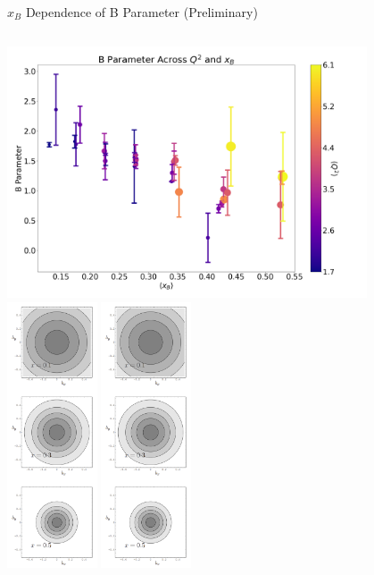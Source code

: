\documentclass[aspectratio=169]{beamer}
\begin{document}
\begin{frame}{$x_B$ Dependence of B Parameter (Preliminary)}

            \begin{columns}

                        \centering
                        \includegraphics[width=0.799\textwidth]{defense/B_vs_Q2_and_xB.png} \\
                        \includegraphics[trim={0 17cm 0 0cm},clip,width=0.2\textwidth]{lastminute/xbB.png}
                        \includegraphics[trim={0 8.5cm 0 8.5cm},clip,width=0.2\textwidth]{lastminute/xbB.png}

\end{columns}
\end{frame}
\end{document}
